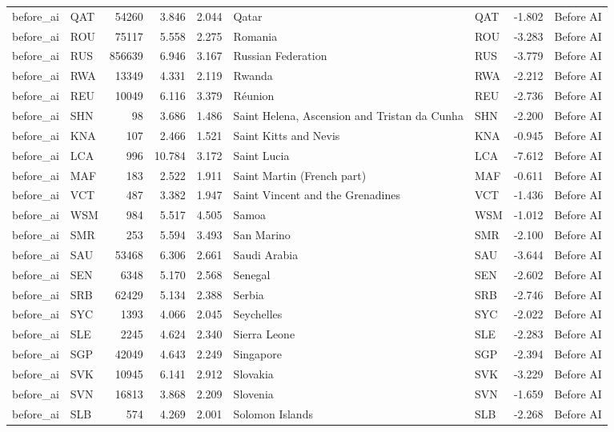 \begin{tabular}{llrrrllrl}
before\_ai & QAT & 54260 & 3.846 & 2.044 & Qatar & QAT & -1.802 & Before AI \\
before\_ai & ROU & 75117 & 5.558 & 2.275 & Romania & ROU & -3.283 & Before AI \\
before\_ai & RUS & 856639 & 6.946 & 3.167 & Russian Federation & RUS & -3.779 & Before AI \\
before\_ai & RWA & 13349 & 4.331 & 2.119 & Rwanda & RWA & -2.212 & Before AI \\
before\_ai & REU & 10049 & 6.116 & 3.379 & Réunion & REU & -2.736 & Before AI \\
before\_ai & SHN & 98 & 3.686 & 1.486 & Saint Helena, Ascension and Tristan da Cunha & SHN & -2.200 & Before AI \\
before\_ai & KNA & 107 & 2.466 & 1.521 & Saint Kitts and Nevis & KNA & -0.945 & Before AI \\
before\_ai & LCA & 996 & 10.784 & 3.172 & Saint Lucia & LCA & -7.612 & Before AI \\
before\_ai & MAF & 183 & 2.522 & 1.911 & Saint Martin (French part) & MAF & -0.611 & Before AI \\
before\_ai & VCT & 487 & 3.382 & 1.947 & Saint Vincent and the Grenadines & VCT & -1.436 & Before AI \\
before\_ai & WSM & 984 & 5.517 & 4.505 & Samoa & WSM & -1.012 & Before AI \\
before\_ai & SMR & 253 & 5.594 & 3.493 & San Marino & SMR & -2.100 & Before AI \\
before\_ai & SAU & 53468 & 6.306 & 2.661 & Saudi Arabia & SAU & -3.644 & Before AI \\
before\_ai & SEN & 6348 & 5.170 & 2.568 & Senegal & SEN & -2.602 & Before AI \\
before\_ai & SRB & 62429 & 5.134 & 2.388 & Serbia & SRB & -2.746 & Before AI \\
before\_ai & SYC & 1393 & 4.066 & 2.045 & Seychelles & SYC & -2.022 & Before AI \\
before\_ai & SLE & 2245 & 4.624 & 2.340 & Sierra Leone & SLE & -2.283 & Before AI \\
before\_ai & SGP & 42049 & 4.643 & 2.249 & Singapore & SGP & -2.394 & Before AI \\
before\_ai & SVK & 10945 & 6.141 & 2.912 & Slovakia & SVK & -3.229 & Before AI \\
before\_ai & SVN & 16813 & 3.868 & 2.209 & Slovenia & SVN & -1.659 & Before AI \\
before\_ai & SLB & 574 & 4.269 & 2.001 & Solomon Islands & SLB & -2.268 & Before AI \\

\end{tabular}
